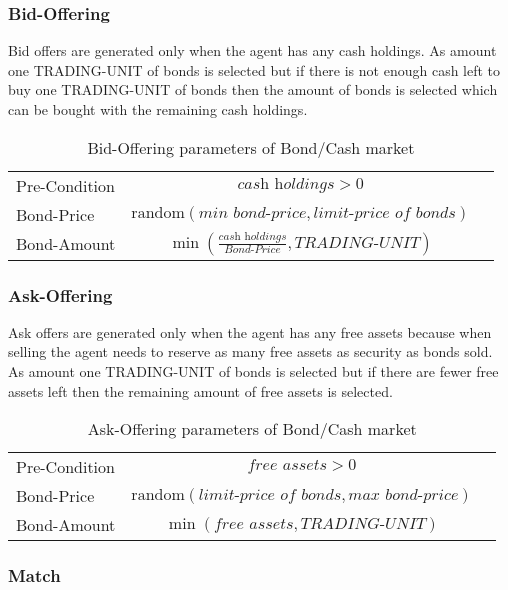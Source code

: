 \documentclass[Bachelorarbeit.tex]{subfiles}
\begin{document}
\subsubsection{Bid-Offering}
Bid offers are generated only when the agent has any cash holdings. As amount one TRADING-UNIT of bonds is selected but if there is not enough cash left to buy one TRADING-UNIT of bonds then the amount of bonds is selected which can be bought with the remaining cash holdings.

\begin{table}[H]
	\centering
	\caption{Bid-Offering parameters of Bond/Cash market}
	\begin{tabular} { l c r }
		\hline
		Pre-Condition & $\textit{cash holdings} > 0$  \\
		Bond-Price & $\mathrm{random}(\textit{min bond-price}, \textit{limit-price of bonds})$ \\
		Bond-Amount & $\min (\frac{\textit{cash holdings} }{ \textit{Bond-Price} }, \textit{TRADING-UNIT} )$ \\
		\hline
	\end{tabular}
\end{table}

\subsubsection{Ask-Offering}
Ask offers are generated only when the agent has any free assets because when selling the agent needs to reserve as many free assets as security as bonds sold. As amount one TRADING-UNIT of bonds is selected but if there are fewer free assets left then the remaining amount of free assets is selected.

\begin{table}[H]
	\centering
	\caption{Ask-Offering parameters of Bond/Cash market}
	\begin{tabular} { l c r }
		\hline
		Pre-Condition & $\textit{free assets} > 0$  \\
		Bond-Price & $\mathrm{random}(\textit{limit-price of bonds}, \textit{max bond-price})$ \\
		Bond-Amount & $\min ({\textit{free assets} }, \textit{TRADING-UNIT} )$ \\
		\hline
	\end{tabular}
\end{table}

\subsubsection{Match}
\end{document}
